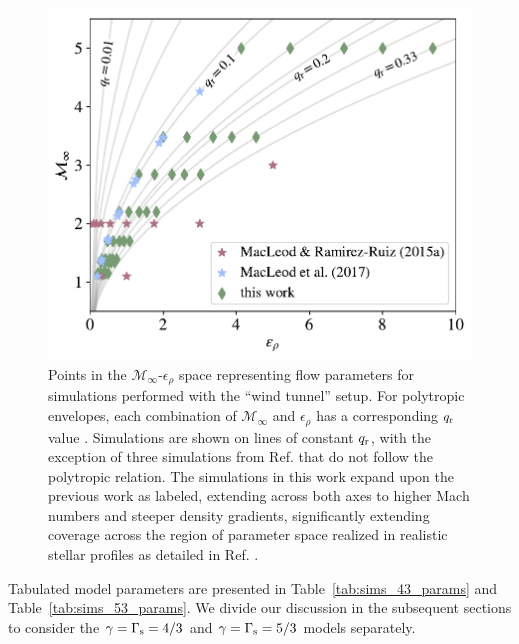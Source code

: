 \begin{figure}[t]
  \includegraphics[width=\columnwidth]{figures/common_envelope/paramspace_v4.pdf}
 \caption{Points in the $\mathcal{M}_{\infty}$-$\epsilon_{\rho}$ space representing flow parameters for simulations performed with the ``wind tunnel'' setup. For polytropic envelopes, each combination of $\mathcal{M}_{\infty}$ and $\epsilon_{\rho}$ has a corresponding $q_{\rm r}$ value \cite{MacLeod:2017}. Simulations are shown on lines of constant $q_{\rm r}$, with the exception of three simulations from Ref. \cite{MacLeod_2015} that do not follow the polytropic relation. The simulations in this work expand upon the previous work as labeled, extending across both axes to higher Mach numbers and steeper density gradients, significantly extending coverage across the region of parameter space realized in realistic stellar profiles as detailed in Ref. \cite{Everson:2020eeq}.\label{fig:parameterspace}}
\vspace*{5mm}
\end{figure}

Tabulated model parameters are presented in Table~\ref{tab:sims_43_params} and Table~\ref{tab:sims_53_params}. We divide our discussion in the subsequent sections to consider the $\gamma = \Gamma_{\rm s}=4/3$ and $\gamma=\Gamma_{\rm s} = 5/3$ models separately.


